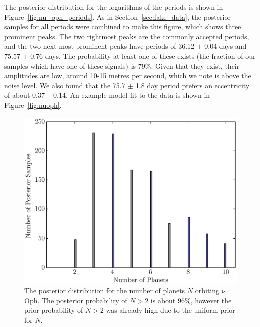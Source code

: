 \documentclass[useAMS,usenatbib]{mn2e}
\begin{document}
The posterior distribution for the logarithms of the periods is shown in
Figure~\ref{fig:nu_oph_periods}. As in Section~\ref{sec:fake_data},
the posterior samples for all periods were combined to make this figure, which
shows three prominent peaks. 
The two rightmost peaks are the commonly accepted periods, and the two next
most prominent peaks have periods of 36.12 $\pm$ 0.04 days and
75.57 $\pm$ 0.76 days.
The probability
at least one of these exists (the fraction of our samples which
have one of these signals) is 79\%.
Given that they exist, their amplitudes are low, around 10-15 metres per second,
which we note is above the noise level. We also found that the 75.7 $\pm$ 1.8 day
period prefers an eccentricity of about $0.37 \pm 0.14$.
An example model fit to the data is shown in Figure~\ref{fig:nuoph}.

\begin{figure}
\includegraphics[scale=0.45]{Figures/nu_oph_N.eps}
\caption{The posterior distribution for the number of planets $N$ orbiting
$\nu$ Oph. The posterior probability of $N > 2$ is about 96\%, however the
prior probability of $N > 2$ was already high due to the uniform prior for $N$.
\label{fig:nu_oph_N}}
\end{figure}
\end{document}
